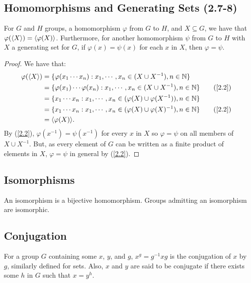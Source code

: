 \subsection{Homomorphisms and Generating Sets (2.7-8)} \label{2.7} \label{2.8}

For $G$ and $H$ groups, a homomorphism $\varphi$ from $G$ to $H$, and $X \subseteq G$,
we have that \linebreak $\varphi({\langle X \rangle}) = {\langle \varphi(X) \rangle}$.
Furthermore, for another homomorphism $\psi$ from $G$ to $H$ with $X$
a generating set for $G$, if $\varphi(x) = \psi(x)$ for each $x$ in $X$,
then $\varphi = \psi$.

\begin{proof}
    We have that: \begin{align*}
        \varphi(\ang{X})
        &= \{\varphi(x_1 \cdots x_n) 
            : x_1, \cdots, x_n \in (X \cup X^{-1}), n \in \mb{N}\} \\
        &= \{\varphi(x_1) \cdots \varphi(x_n) 
            : x_1, \cdots, x_n \in (X \cup X^{-1}), n \in \mb{N}\} \tag{\ref{2.2}} \\
        &= \{x_1 \cdots x_n
            : x_1, \cdots, x_n \in (\varphi(X) \cup \varphi(X^{-1})), n \in \mb{N}\} \\
        &= \{x_1 \cdots x_n
            : x_1, \cdots, x_n \in (\varphi(X) \cup \varphi(X)^{-1}), n \in \mb{N}\} 
            \tag{\ref{2.2}} \\
        &= \ang{\varphi(X)}.
    \end{align*} By (\ref{2.2}), $\varphi(x^{-1}) = \psi(x^{-1})$ for every $x$ in $X$
    so $\varphi = \psi$ on all members of $X \cup X^{-1}$. But, as every element of
    $G$ can be written as a finite product of elements in $X$, $\varphi = \psi$
    in general by (\ref{2.2}).
\end{proof}

\subsection{Isomorphisms}

An isomorphism is a bijective homomorphism. Groups admitting an isomorphism are
isomorphic.

\subsection{Conjugation}

For a group $G$ containing some $x$, $y$, and $g$,
$x^g = g^{-1}xg$ is the conjugation of $x$ by $g$, similarly defined
for sets. Also, $x$ and $y$ are said to be conjugate if there exists some $h$ in
$G$ such that $x = y^h$.

